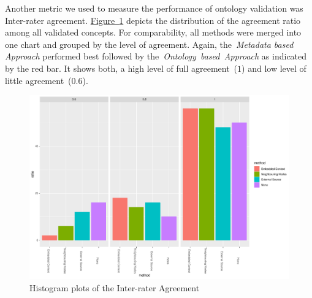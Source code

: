 Another metric we used to measure the performance of ontology validation was Inter-rater agreement. 
\hyperref[fig:hist_agreement_finance_all]{Figure~\ref*{fig:hist_agreement_finance_all}} depicts the distribution of the agreement ratio among all validated concepts. For comparability, all methods were merged into one chart and grouped by the level of agreement. Again, the~\emph{Metadata based Approach} performed best followed by the~\emph{Ontology~based~Approach} as indicated by the red bar. It shows both, a high level of full agreement~($1$) and low level of little agreement~($0.6$). 
\begin{figure}
  	 \includegraphics[width=\textwidth]{plots/finance/hist_agreement}
  	 \caption{Histogram plots of the Inter-rater Agreement}\label{fig:hist_agreement_finance_all}
\end{figure}
 
